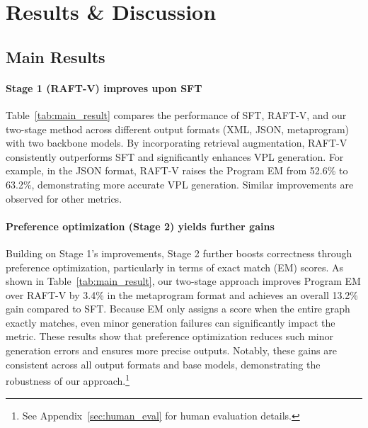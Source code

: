 \section{\label{sec:result}Results \& Discussion}

\subsection{\label{sec:overall_performance}Main Results}
\paragraph{Stage 1 (RAFT-V) improves upon SFT} Table~\ref{tab:main_result} compares the performance of SFT, RAFT-V, and our two-stage method across different output formats (XML, JSON, metaprogram) with two backbone models. By incorporating retrieval augmentation, RAFT-V consistently outperforms SFT and significantly enhances VPL generation. For example, in the JSON format, RAFT-V raises the Program EM from 52.6\% to 63.2\%, demonstrating more accurate VPL generation. Similar improvements are observed for other metrics.

\paragraph{Preference optimization (Stage 2) yields further gains} Building on Stage 1's improvements, Stage 2 further boosts correctness through preference optimization, particularly in terms of exact match (EM) scores. As shown in Table~\ref{tab:main_result}, our two-stage approach improves Program EM over RAFT-V by 3.4\% in the metaprogram format and achieves an overall 13.2\% gain compared to SFT. Because EM only assigns a score when the entire graph exactly matches, even minor generation failures can significantly impact the metric. These results show that preference optimization reduces such minor generation errors and ensures more precise outputs. Notably, these gains are consistent across all output formats and base models, demonstrating the robustness of our approach.\footnote{See Appendix~\ref{sec:human_eval} for human evaluation details.}

